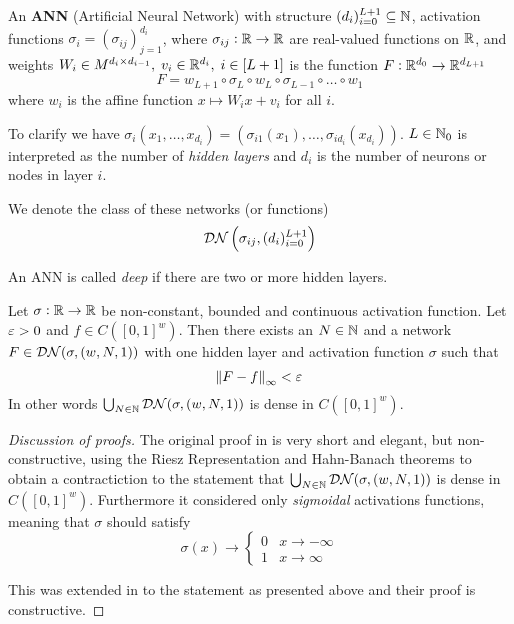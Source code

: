 \begin{defn}\label{def_ANN}
  An \textbf{ANN} (Artificial Neural Network) with structure
  $(d_i)_{i=0}^{L+1} \subseteq \mathbb{N}$,
  activation functions $\sigma_i = (\sigma_{ij})_{j=1}^{d_i}$, where
  $\sigma_{ij} : \mathbb{R} \to \mathbb{R}$ are real-valued functions on $\mathbb{R}$,
  and weights $W_i \in M^{d_i \times d_{i-1}}, \; v_i \in \mathbb{R}^{d_i}, \;
  i \in [L+1]$
  is the function $F:\mathbb{R}^{d_0} \to \mathbb{R}^{d_{L+1}}$ 
  \[ F = w_{L+1} \circ \sigma_L \circ w_L
  \circ \sigma_{L-1} \circ \dots \circ w_1 \]
  where $w_i$ is the affine function $x \mapsto W_i x + v_i$ for all $i$.
\end{defn}

To clarify we have $\sigma_i(x_1, \dots, x_{d_i})
= (\sigma_{i1}(x_1), \dots, \sigma_{id_{i}}(x_{d_{i}}))$.
$L \in \mathbb{N}_0$ is interpreted as the number of \emph{hidden layers} and
$d_i$ is the number of neurons or nodes in layer $i$.

We denote the class of these networks (or functions)
\[ \mathcal{DN} \left(\sigma_{ij}, ( d_i )_{i=0}^{L+1} \right) \]

An ANN is called \emph{deep} if there are two or more hidden layers.


\begin{thm}
  Let $\sigma: \mathbb{R} \to \mathbb{R}$ be non-constant, bounded and continuous
  activation function.
  Let $\varepsilon > 0$ and $f \in C([0,1]^w)$.
  Then there exists an $N \in \mathbb{N}$ and a network
  $F \in \mathcal{DN}(\sigma, (w, N, 1))$
  with one hidden layer
  and activation function $\sigma$ such that
  \[ \norm{F - f}_\infty < \varepsilon \]
  In other words $\bigcup_{N \in \mathbb{N}} \mathcal{DN}(\sigma, (w, N, 1))$ is
  dense in $C([0,1]^w)$.
  \label{thm:uniApprox}
\end{thm}
\begin{proof}[Discussion of proofs]
  The original proof in  is very short and elegant,
  but non-constructive,
  using the Riesz Representation and Hahn-Banach theorems to
  obtain a contractiction to the statement that
  $\bigcup_{N \in \mathbb{N}} \mathcal{DN}(\sigma, (w,N,1))$
  is dense in $C([0,1]^w)$.
  Furthermore it considered only \emph{sigmoidal} activations
  functions, meaning that $\sigma$ should satisfy
  \[ \sigma(x) \to \begin{cases} 0 & x \to -\infty
  \\ 1 & x \to \infty \end{cases} \]
  
  This was extended in  to the statement as presented above
  and their proof is constructive. 
\end{proof}

